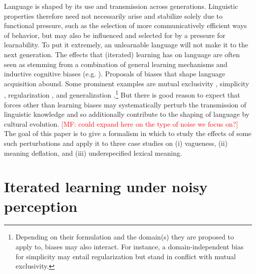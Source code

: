 \documentclass[10pt,a4paper]{article}
\newcommand{\mf}[1]{\textcolor{Red}{[MF: #1]}}
\begin{document}
Language is shaped by its use and transmission across generations. Linguistic properties
therefore need not necessarily arise and stabilize solely due to functional pressure, such as
the selection of more communicatively efficient ways of behavior, but may also be influenced
and selected for by a pressure for learnability. To put it extremely, an unlearnable language
will not make it to the next generation. The effects that (iterated) learning has on language
are often seen as stemming from a combination of general learning mechanisms and inductive
cognitive biases
(e.g. \citealt{griffiths+kalish:2007,kirby+etal:2014,tamariz+kirby:2016}). Proposals of biases
that shape language acquisition abound. Some prominent examples are mutual exclusivity
\citep{merriman+bowman:1989,clark:2009}, simplicity \citep{kirby+etal:2015}, regularization
\citep{hudson+etal:2005}, and generalization
\citep{smith:2011,oconnor:2015}.\footnote{Depending on their formulation and the domain(s) they
  are proposed to apply to, biases may also interact. For instance, a domain-independent bias
  for simplicity may entail regularization but stand in conflict with mutual exclusivity.} But
there is good reason to expect that forces other than learning biases may systematically
perturb the transmission of linguistic knowledge and so additionally contribute to the shaping
of language by cultural evolution. \mf{could expand here on the type of noise we focus on?} The
goal of this paper is to give a formalism in which to study the effects of some such
perturbations and apply it to three case studies on (i) vagueness, (ii) meaning deflation, and
(iii) underspecified lexical meaning.

\section{Iterated learning under noisy perception}
\end{document}
